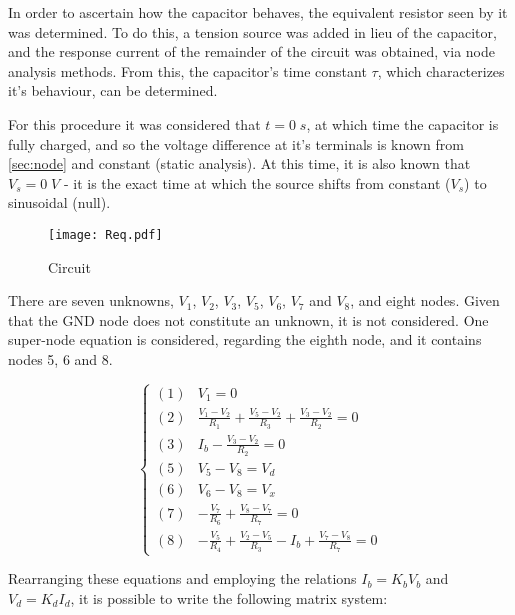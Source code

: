 In order to ascertain how the capacitor behaves, the equivalent resistor seen by it was determined. To do this, a tension source was added in lieu of the capacitor, and the response current of the remainder of the circuit was obtained, via node analysis methods. From this, the capacitor's time constant $\tau$, which characterizes it's behaviour, can be determined.

For this procedure it was considered that $t=0\;s$, at which time the capacitor is fully charged, and so the voltage difference at it's terminals is known from \ref{sec:node} and constant (static analysis). At this time, it is also known that $V_s=0\;V$ - it is the exact time at which the source shifts from constant ($V_s$) to sinusoidal (null).

\begin{figure}[H]
  \centering
  \texttt{[image: Req.pdf]}
  \caption{Circuit}
  \label{Req_fig}
\end{figure}

There are seven unknowns, $V_1$, $V_2$, $V_3$, $V_5$, $V_6$, $V_7$ and $V_8$, and eight nodes. Given that the GND node does not constitute an unknown, it is not considered. One super-node equation is considered, regarding the eighth node, and it contains nodes 5, 6 and 8.

\begin{equation}
  \begin{cases}
    (1) & V_1=0 \\
    (2) & \frac{V_1-V_2}{R_1} + \frac{V_5-V_2}{R_3} + \frac{V_3-V_2}{R_2} = 0 \\
    (3) & I_b - \frac{V_3-V_2}{R_2} = 0 \\
    (5) & V_5-V_8 = V_d \\
    (6) & V_6-V_8 = V_x \\
    (7) & -\frac{V_7}{R_6} + \frac{V_8-V_7}{R_7} = 0 \\
    (8) & -\frac{V_5}{R_4}+\frac{V_2-V_5}{R_3}-I_b+\frac{V_7-V_8}{R_7} = 0
  \end{cases}
\end{equation}

Rearranging these equations and employing the relations $I_b = K_bV_b$ and $V_d = K_dI_d$, it is possible to write the following matrix system:


